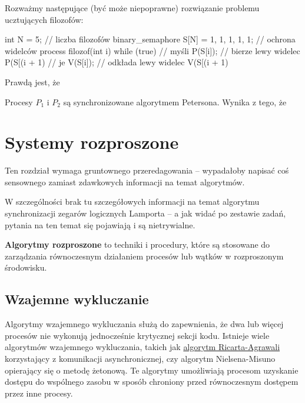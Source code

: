 \begin{problems}
    \prob Rozważmy następujące (być może niepoprawne) rozwiązanie problemu ucztujących filozofów:
    \begin{java}
        int N = 5; // liczba filozofów
        binary_semaphore S[N] = {1, 1, 1, 1, 1}; // ochrona widelców
        process filozof(int i) {
            while (true) {
                // myśli
                P(S[i]); // bierze lewy widelec
                P(S[(i + 1) %
                // je
                V(S[i]); // odkłada lewy widelec
                V(S[(i + 1) %
            }
        }
    \end{java}
    Prawdą jest, że
    
    \prob Procesy $P_1$ i $P_2$ są synchronizowane algorytmem Petersona. Wynika z tego, że
\end{problems}


\section{Systemy rozproszone}

\begin{editorsnote}
    Ten rozdział wymaga gruntownego przeredagowania -- wypadałoby napisać coś sensownego zamiast zdawkowych informacji na temat algorytmów.

    W szczególności brak tu szczegółowych informacji na temat algorytmu synchronizacji zegarów logicznych Lamporta -- a jak widać po zestawie zadań, pytania na ten temat się pojawiają i są nietrywialne.
\end{editorsnote}

\textbf{Algorytmy rozproszone} to techniki i procedury, które są stosowane do zarządzania równoczesnym działaniem procesów lub wątków w rozproszonym środowisku.

\subsection{Wzajemne wykluczanie}
Algorytmy wzajemnego wykluczania służą do zapewnienia, że dwa lub więcej procesów nie wykonują jednocześnie krytycznej sekcji kodu. Istnieje wiele algorytmów wzajemnego wykluczania, takich jak  \href{https://en.wikipedia.org/wiki/Ricart–Agrawala_algorithm}{algorytm Ricarta-Agrawali} korzystający z komunikacji asynchronicznej, czy algorytm Nielsena-Misuno opierający się o metodę żetonową. Te algorytmy umożliwiają procesom uzyskanie dostępu do wspólnego zasobu w sposób chroniony przed równoczesnym dostępem przez inne procesy.

